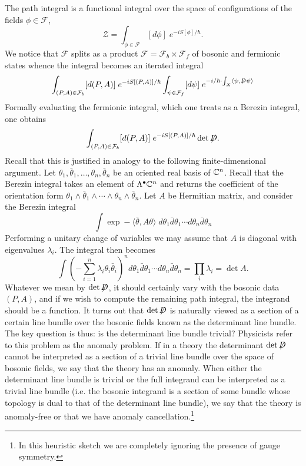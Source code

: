 \documentclass{amsart}
\newcommand{\fsl}[1]{{\centernot{#1}}}
\begin{document}
The path integral is a functional integral over the space of configurations of the fields
$\phi\in\mathcal{F}$,
\begin{equation*}
    \mathcal{Z} = \int_{\phi\in\mathcal{F}} [d\phi] \; e^{-iS[\phi]/\hbar}.
\end{equation*}
We notice that $\mathcal{F}$ splits as a product $\mathcal{F}=\mathcal{F}_b\times \mathcal{F}_f$
of bosonic and fermionic states whence the integral becomes an iterated integral
\begin{equation*}
    \int_{(P,A)\in \mathcal{F}_b} [d(P,A)]\; e^{-iS[(P,A)]/\hbar} \int_{\psi\in\mathcal{F}_f} [d\psi]\; e^{-i/\hbar\cdot\int_X\langle\psi,\fsl D\psi\rangle}
\end{equation*}
Formally evaluating the fermionic integral, which one treats as a Berezin integral,
one obtains
\begin{equation*}
    \int_{(P,A)\in \mathcal{F}_b} [d(P,A)]\; e^{-iS[(P,A)]/\hbar} \det\fsl D.
\end{equation*}
Recall that this is justified in analogy to the following finite-dimensional argument.
Let $\theta_1,\bar\theta_1,\ldots,\theta_n,\bar\theta_n$ be an oriented real basis of
$\mathbb{C}^n$. Recall that the Berezin integral takes an element of $\Lambda^\bullet\mathbb{C}^n$ and
returns the coefficient of the orientation form
$\theta_1\wedge\bar\theta_1\wedge\cdots\wedge\theta_n\wedge\bar\theta_n$. Let $A$ be
Hermitian matrix, and consider the Berezin integral
\begin{equation*}
    \int \exp -\langle\bar\theta, A\theta\rangle \; d\theta_1\bar d\theta_1\cdots d\theta_n\bar d\theta_n
\end{equation*}
Performing a unitary change of variables we may assume that $A$ is diagonal with
eigenvalues $\lambda_i$. The integral then becomes
\begin{equation*}
    \int (-\sum_{i=1}^n\lambda_i\theta_i\bar\theta_i)^n d\theta_1\bar d\theta_1\cdots d\theta_n\bar d\theta_n
    =\prod_i\lambda_i = \det A.
\end{equation*}
Whatever we mean by $\det\fsl D$, it should certainly vary with the bosonic data $(P,A)$,
and if we wish to compute the remaining path integral, the integrand should be a function.
It turns out that $\det\fsl D$ is naturally viewed as a section of a certain line bundle
over the bosonic fields known as the determinant line bundle. The key question is thus:
is the determinant line bundle trivial? Physicists refer to this problem as the anomaly problem.
If in a theory the determinant $\det\fsl D$ cannot be interpreted as a section of a trivial
line bundle over the space of bosonic fields, we say that the theory has an anomaly. 
When either the determinant line bundle is trivial or the full integrand can be interpreted
as a trivial line bundle (i.e. the bosonic integrand is a section of some bundle whose
topology is dual to that of the determinant line bundle), we say that the theory is anomaly-free
or that we have anomaly cancellation.\footnote{In this heuristic sketch we are completely
ignoring the presence of gauge symmetry.}
\end{document}
